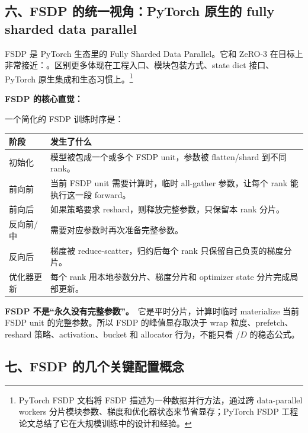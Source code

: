 \subsection{六、FSDP 的统一视角：PyTorch 原生的 fully sharded data parallel}

FSDP 是 PyTorch 生态里的 Fully Sharded Data Parallel。它和 ZeRO-3 在目标上非常接近：。区别更多体现在工程入口、模块包装方式、state dict 接口、PyTorch 原生集成和生态习惯上。\footnote{PyTorch FSDP 文档将 FSDP 描述为一种数据并行方法，通过跨 data-parallel workers 分片模块参数、梯度和优化器状态来节省显存；PyTorch FSDP 工程论文总结了它在大规模训练中的设计和经验。}

\begin{summarybox}
\textbf{FSDP 的核心直觉：}\
\end{summarybox}

一个简化的 FSDP 训练时序是：

\begin{center}
{\small
\begin{tabular}{p{3.2cm}p{9.4cm}}
\hline
\textbf{阶段} & \textbf{发生了什么} \\
\hline
初始化 & 模型被包成一个或多个 FSDP unit，参数被 flatten/shard 到不同 rank。 \\
前向前 & 当前 FSDP unit 需要计算时，临时 all-gather 参数，让每个 rank 能执行这一段 forward。 \\
前向后 & 如果策略要求 reshard，则释放完整参数，只保留本 rank 分片。 \\
反向前/中 & 需要对应参数时再次准备完整参数。 \\
反向后 & 梯度被 reduce-scatter，归约后每个 rank 只保留自己负责的梯度分片。 \\
优化器更新 & 每个 rank 用本地参数分片、梯度分片和 optimizer state 分片完成局部更新。 \\
\hline
\end{tabular}
}
\end{center}

\begin{warnbox}
\textbf{FSDP 不是“永久没有完整参数”。}\
它是平时分片，计算时临时 materialize 当前 FSDP unit 的完整参数。所以 FSDP 的峰值显存取决于 wrap 粒度、prefetch、reshard 策略、activation、bucket 和 allocator 行为，不能只看 $/D$ 的稳态公式。
\end{warnbox}

\subsection{七、FSDP 的几个关键配置概念}

